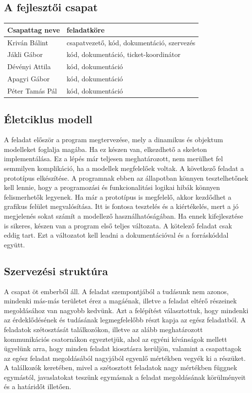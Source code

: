 \subsection{A fejlesztői csapat}

\begin{center}
\begin{tabular}{l | l}
	\textbf{Csapattag neve} & \textbf{feladatköre} \\
	\hline
	Kriván Bálint & csapatvezető, kód, dokumentáció, szervezés \\ 
	Jákli Gábor & kód, dokumentáció, ticket-koordinátor \\ 
	Dévényi Attila & kód, dokumentáció \\ 
	Apagyi Gábor & kód, dokumentáció \\ 
	Péter Tamás Pál & kód, dokumentáció 
\end{tabular}
\end{center}

\subsection{Életciklus modell}

A feladat először a program megtervezése, mely a dinamikus és objektum modelleket foglalja magába. Ha ez készen van, elkezdhető a skeleton implementálása. Ez a lépés már teljesen meghatározott, nem merülhet fel semmilyen komplikáció, ha a modellek megfelelőek voltak.
A következő feladat a prototípus elkészítése. A programnak ebben az állapotban könnyen tesztelhetőnek kell lennie, hogy a programozási és funkcionalitási logikai hibák könnyen felismerhetők legyenek. Ha már a prototípus is megfelelő, akkor kezdődhet a grafikus felület megvalósítása. Itt is fontosa tesztelés és a kiértékelés, mert a jó megjelenés sokat számít a modellező használhatóságában. Ha ennek kifejlesztése is sikeres, készen van a program első teljes változata. A kötelező feladat csak eddig tart. Ezt a változatot kell leadni a dokumentációval és a forráskóddal együtt.

\subsection{Szervezési struktúra}

A csapat öt emberből áll. A feladat szempontjából a tudásunk nem azonos, mindenki más-más területet érez a magáénak, illetve a feladat eltérő részeinek megoldásához van nagyobb kedvünk. Azt a felépítést választottuk, hogy mindenki az érdeklődésének és tudásának legmegfelelőbb részt kapja az egész feladatból. A feladatok szétosztását találkozókon, illetve az alább meghatározott kommunikációs csatornákon egyeztetjük, ahol az egyéni kívánságok mellett ügyelünk arra, hogy minden feladat kiosztásra kerüljön, valamint a csapattagok az egész feladat megoldásából nagyjából egyenlő mértékben vegyék ki a részüket. A találkozók keretében, mivel a szétosztott feladatok nagy mértékben függnek egymástól, javaslatokat teszünk egymásnak a feladat megoldásának körülményeit és a határidőt illetően.\\

